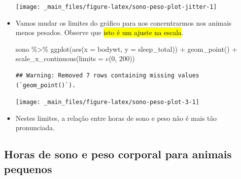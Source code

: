 \documentclass[
  11pt]{report}
\newenvironment{Shaded}{\begin{snugshade}}{\end{snugshade}}
\newcommand{\AttributeTok}[1]{\textcolor[rgb]{0.77,0.63,0.00}{#1}}
\newcommand{\DecValTok}[1]{\textcolor[rgb]{0.00,0.00,0.81}{#1}}
\newcommand{\FunctionTok}[1]{\textcolor[rgb]{0.00,0.00,0.00}{#1}}
\newcommand{\NormalTok}[1]{#1}
\newcommand{\SpecialCharTok}[1]{\textcolor[rgb]{0.00,0.00,0.00}{#1}}
\renewenvironment{Shaded}{
    \begin{mdframed}[%
      roundcorner=2pt,%
      innerleftmargin=5pt,%
      innerrightmargin=5pt,%
      topline=true,%
      leftline=true,%
      rightline=true,%
      bottomline=true,%
      linewidth=0.5pt,%
      linecolor=black!20,%
      backgroundcolor=black!2,%
      skipabove=2ex,%
      skipbelow=2.5ex%
    ]%
  }
  {
    \end{mdframed}
  }
\begin{document}
\begin{itemize}
  \begin{center}\texttt{[image: \_main\_files/figure-latex/sono-peso-plot-jitter-1]} \end{center}
\item
  Vamos mudar os limites do gráfico para nos concentrarmos nos animais menos pesados. Observe que {\hl{isto é um ajuste na escala}}.

\begin{Shaded}
\begin{Highlighting}[]
\NormalTok{sono }\SpecialCharTok{\%\textgreater{}\%} 
  \FunctionTok{ggplot}\NormalTok{(}\FunctionTok{aes}\NormalTok{(}\AttributeTok{x =}\NormalTok{ bodywt, }\AttributeTok{y =}\NormalTok{ sleep\_total)) }\SpecialCharTok{+}
    \FunctionTok{geom\_point}\NormalTok{() }\SpecialCharTok{+}
    \FunctionTok{scale\_x\_continuous}\NormalTok{(}\AttributeTok{limits =} \FunctionTok{c}\NormalTok{(}\DecValTok{0}\NormalTok{, }\DecValTok{200}\NormalTok{))}
\end{Highlighting}
\end{Shaded}

\begin{verbatim}
## Warning: Removed 7 rows containing missing values (`geom_point()`).
\end{verbatim}

  \begin{center}\texttt{[image: \_main\_files/figure-latex/sono-peso-plot-3-1]} \end{center}
\item
  Nestes limites, a relação entre horas de sono e peso não é mais tão pronunciada.
\end{itemize}

\hypertarget{horas-de-sono-e-peso-corporal-para-animais-pequenos}{%
\subsection{Horas de sono e peso corporal para animais pequenos}\label{horas-de-sono-e-peso-corporal-para-animais-pequenos}}
\end{document}
